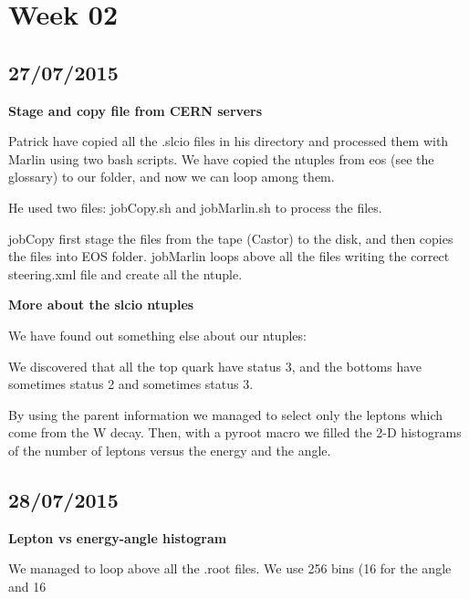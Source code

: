 \section{Week 02}

\subsection{27/07/2015}

\textbf{Stage and copy file from CERN servers}

Patrick have copied all the .slcio files in his directory and processed them with Marlin using two bash scripts. We have copied the ntuples from eos (see the glossary) to our folder, and now we can loop among them. 

He used two files: jobCopy.sh and jobMarlin.sh to process the files.

jobCopy first stage the files from the tape (Castor) to the disk, and then copies the files into EOS folder.
jobMarlin loops above all the files writing the correct steering.xml file and create all the ntuple.

\textbf{More about the slcio ntuples}

We have found out something else about our ntuples: 

We discovered that all the top quark have status 3, and the bottoms have sometimes status 2 and sometimes status 3.

By using the parent information we managed to select only the leptons which come from the W decay. Then, with a pyroot macro we filled the 2-D histograms of the number of leptons versus the energy and the angle.

\subsection{28/07/2015}

\textbf{Lepton vs energy-angle histogram}

We managed to loop above all the .root files. We use 256 bins (16 for the angle and 16 